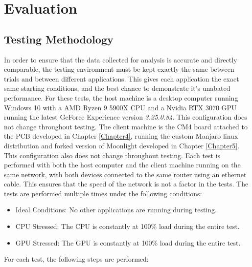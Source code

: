 \chapter{Evaluation} %

\label{Chapter6} %


\section{Testing Methodology}

In order to ensure that the data collected for analysis is accurate and directly comparable, the testing environment must be kept exactly the same between trials and between different applications.
This gives each application the exact same starting conditions, and the best chance to demonstrate it's unabated performance.
For these tests, the host machine is a desktop computer running Windows 10 with a AMD Ryzen 9 5900X CPU and a Nvidia RTX 3070 GPU running the latest GeForce Experience version \emph{3.25.0.84}.
This configuration does not change throughout testing.
The client machine is the CM4 board attached to the PCB developed in Chapter \ref{Chapter4}, running the custom Manjaro linux distribution and forked version of Moonlight developed in Chapter \ref{Chapter5}.
This configuration also does not change throughout testing.
Each test is performed with both the host computer and the client machine running on the same network, with both devices connected to the same router using an ethernet cable.
This ensures that the speed of the network is not a factor in the tests.
The tests are performed multiple times under the following conditions:

\begin{itemize}
  \item Ideal Conditions: No other applications are running during testing.
  \item CPU Stressed: The CPU is constantly at 100\% load during the entire test.
  \item GPU Stressed: The GPU is constantly at 100\% load during the entire test.
\end{itemize}

\noindent
For each test, the following steps are performed:

